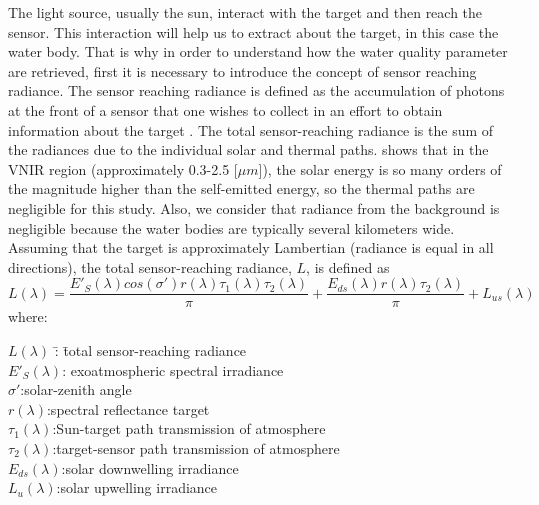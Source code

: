 The light source, usually the sun, interact with the target and then reach the sensor. This interaction will help us to extract about the target, in this case the water body. That is why in order to understand how the water quality parameter are retrieved, first it is necessary to introduce the concept of sensor reaching radiance. The sensor reaching radiance is defined as the accumulation of photons at the front of a sensor that one wishes to collect in an effort to obtain information about the target \cite{GeraceThesis} . The total sensor-reaching radiance is the sum of the radiances due to the individual solar and thermal paths.  \cite{Schott} shows that in the VNIR region (approximately 0.3-2.5 [$\mu m$]), the solar energy is so many orders of the magnitude higher than the self-emitted energy, so the thermal paths are negligible for this study. Also, we consider that radiance from the background is negligible because the water bodies are typically several kilometers wide. Assuming that the target is approximately Lambertian (radiance is equal in all directions), the total sensor-reaching radiance, $L$, is defined as \begin{equation} \label{eq:gov1} L(\lambda) = \frac{E'_S(\lambda)cos(\sigma')r(\lambda)\tau_1(\lambda)\tau_2(\lambda)}{\pi} +
                        \frac{E_{ds}(\lambda)r(\lambda)\tau_2(\lambda)}{\pi} + L_{us}(\lambda)
\end{equation} 
where:
\begin{tabbing}
\indent \indent \indent  $L(\lambda)$ \hspace{1mm}\=:  \indent \= total sensor-reaching radiance\\
\indent \indent \indent  $E'_S(\lambda)$\>: \>exoatmospheric spectral irradiance\\
\indent \indent \indent $\sigma'$\>:\>solar-zenith angle\\
\indent \indent \indent $r(\lambda)$\>:\>spectral reflectance target\\
\indent \indent \indent $\tau_1(\lambda)$\>:\>Sun-target path transmission of atmosphere\\
\indent \indent \indent $\tau_2(\lambda)$\>:\>target-sensor path transmission of atmosphere\\
\indent \indent \indent $E_{ds}(\lambda)$\>:\>solar downwelling irradiance\\
\indent \indent \indent $L_{u}(\lambda)$\>:\>solar upwelling irradiance\\
\end{tabbing}

